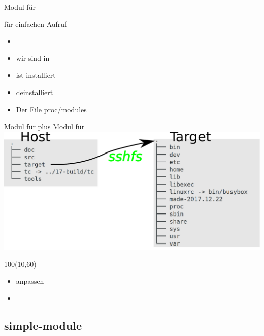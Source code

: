 \begin{frame}{Modul für \host}
 \begin{description}[Makefile]
  \item[Code]     
  \item[Script]    für einfachen Aufruf
  \item[Test]
      \begin{itemize}
	\item {}
        \item {} wir sind in  
	\item {} ist installiert
	\item {} deinstalliert
	\item Der File \url{proc/modules}
      \end{itemize}
 \end{description}
\end{frame}

\begin{frame}{Modul für \targetS}{plus Modul für \host}
 \includegraphics[width=\textwidth]{host-target.pdf}
 \begin{textblock}{100}(10,60)
  \begin{itemize}
   \item {} anpassen
   \item {}
  \end{itemize}
 \end{textblock}
\end{frame}


\subsection{simple-module}


%


